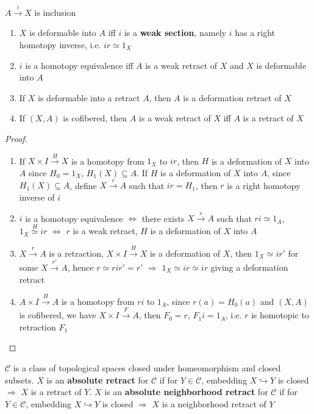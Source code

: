 \documentclass[main]{subfiles}
\begin{document}
\begin{lemma}\label{Some rudimentary lemma about retract and deformation}
$A\xrightarrow iX$ is inclusion 
\begin{enumerate}[leftmargin=*]
\item $X$ is deformable into $A$ iff $i$ is a \textbf{weak section}, namely $i$ has a right homotopy inverse, i.e. $ir\simeq 1_X$ 
\item $i$ is a homotopy equivalence iff $A$ is a weak retract of $X$ and $X$ is deformable into $A$ 
\item If $X$ is deformable into a retract $A$, then $A$ is a deformation retract of $X$
\item If $(X,A)$ is cofibered, then $A$ is a weak retract of $X$ iff $A$ is a retract of $X$
\end{enumerate}
\end{lemma}

\begin{proof}
\begin{enumerate}[leftmargin=*]
\item If $X\times I\xrightarrow HX$ is a homotopy from $1_X$ to $ir$, then $H$ is a deformation of $X$ into $A$ since $H_0=1_X$, $H_1(X)\subseteq A$. If $H$ is a deformation of $X$ into $A$, since $H_1(X)\subseteq A$, define $X\xrightarrow rA$ such that $ir=H_1$, then $r$ is a right homotopy inverse of $i$
\item $i$ is a homotopy equivalence $\Leftrightarrow$ there exists $X\xrightarrow rA$ such that $ri\simeq 1_A$, $1_X\overset{H}{\simeq}ir$ $\Leftrightarrow$ $r$ is a weak retract, $H$ is a deformation of $X$ into $A$
\item $X\xrightarrow rA$ is a retraction, $X\times I\xrightarrow HX$ is a deformation of $X$, then $1_X\simeq ir'$ for some $X\xrightarrow {r'}A$, hence $r\simeq rir'=r'$ $\Rightarrow$ $1_X\simeq ir\simeq ir$ giving a deformation retract 
\item $A\times I\xrightarrow HA$ is a homotopy from $ri$ to $1_A$, since $r(a)=H_0(a)$ and $(X,A)$ is cofibered, we have $X\times I\xrightarrow FA$, then $F_0=r$, $F_1i=1_A$, i.e. $r$ is homotopic to retraction $F_1$
\end{enumerate}
\end{proof}

\begin{definition}
$\mathcal C$ is a class of topological spaces closed under homeomorphism and closed subsets. $X$ is an \textbf{absolute retract} for $\mathcal C$ if for $Y\in \mathcal C$, embedding $X\hookrightarrow Y$ is closed $\Rightarrow$ $X$ is a retract of $Y$. $X$ is an \textbf{absolute neighborhood retract} for $\mathcal C$ if for $Y\in \mathcal C$, embedding $X\hookrightarrow Y$ is closed $\Rightarrow$ $X$ is a neighborhood retract of $Y$
\end{definition}
\end{document}
